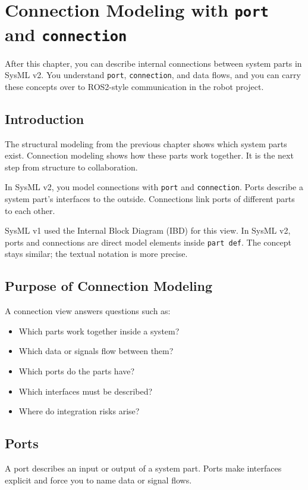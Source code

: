 \chapter{Connection Modeling with \texttt{port} and \texttt{connection}}

\begin{lernziele}
After this chapter, you can describe internal connections between system parts in SysML v2. You understand \texttt{port}, \texttt{connection}, and data flows, and you can carry these concepts over to ROS2-style communication in the robot project.
\end{lernziele}

\section{Introduction}
The structural modeling from the previous chapter shows which system parts exist. Connection modeling shows how these parts work together. It is the next step from structure to collaboration.

In SysML v2, you model connections with \texttt{port} and \texttt{connection}. Ports describe a system part's interfaces to the outside. Connections link ports of different parts to each other.

\begin{hinweisbox}
SysML v1 used the Internal Block Diagram (IBD) for this view. In SysML v2, ports and connections are direct model elements inside \texttt{part def}. The concept stays similar; the textual notation is more precise.
\end{hinweisbox}

\section{Purpose of Connection Modeling}
A connection view answers questions such as:

\begin{itemize}
    \item Which parts work together inside a system?
    \item Which data or signals flow between them?
    \item Which ports do the parts have?
    \item Which interfaces must be described?
    \item Where do integration risks arise?
\end{itemize}

\section{Ports}
A port describes an input or output of a system part. Ports make interfaces explicit and force you to name data or signal flows.

